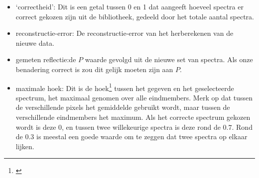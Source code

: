 \documentclass[12pt]{report}
\newcommand{\footcite}[1]{\cite{#1}\let\thefootnote\relax \footnote{\cite{#1} \bibentry{#1}} }
\begin{document}
\begin{itemize}
\item `correctheid': Dit is een getal tussen 0 en 1 dat aangeeft hoeveel spectra er correct gekozen zijn uit de bibliotheek, gedeeld door het totale aantal spectra.
\item reconstructie-error: De reconstructie-error van het herberekenen van de nieuwe data.
\item gemeten reflectie:de $P$ waarde gevolgd uit de nieuwe set van spectra. Als onze benadering correct is zou dit gelijk moeten zijn aan $P$.
\item maximale hoek: Dit is de hoek\footcite{mesma} tussen het gegeven en het geselecteerde spectrum, het maximaal genomen over alle eindmembers. Merk op dat tussen de verschillende pixels het gemiddelde gebruikt wordt, maar tussen de verschillende eindmembers het maximum. Als het correcte spectrum gekozen wordt is deze $0$, en tussen twee willekeurige spectra is deze rond de $0.7$. Rond de $0.3$ is meestal een goede waarde om te zeggen dat twee spectra op elkaar lijken.
\end{itemize}
\end{document}
